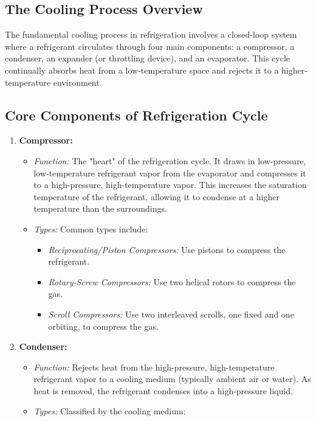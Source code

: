 \subsection{The Cooling Process Overview}
The fundamental cooling process in refrigeration involves a closed-loop system where a refrigerant circulates through four main components: a compressor, a condenser, an expander (or throttling device), and an evaporator. This cycle continually absorbs heat from a low-temperature space and rejects it to a higher-temperature environment.

\subsection{Core Components of Refrigeration Cycle}
\begin{enumerate}
    \item \textbf{Compressor:}
        \begin{itemize}
            \item \textit{Function:} The "heart" of the refrigeration cycle. It draws in low-pressure, low-temperature refrigerant vapor from the evaporator and compresses it to a high-pressure, high-temperature vapor. This increases the saturation temperature of the refrigerant, allowing it to condense at a higher temperature than the surroundings.
            \item \textit{Types:} Common types include:
                \begin{itemize}
                    \item \textit{Reciprocating/Piston Compressors:} Use pistons to compress the refrigerant.
                    \item \textit{Rotary-Screw Compressors:} Use two helical rotors to compress the gas.
                    \item \textit{Scroll Compressors:} Use two interleaved scrolls, one fixed and one orbiting, to compress the gas.
                \end{itemize}
        \end{itemize}
    \item \textbf{Condenser:}
        \begin{itemize}
            \item \textit{Function:} Rejects heat from the high-pressure, high-temperature refrigerant vapor to a cooling medium (typically ambient air or water). As heat is removed, the refrigerant condenses into a high-pressure liquid.
            \item \textit{Types:} Classified by the cooling medium:

\end{itemize}
\end{enumerate}
